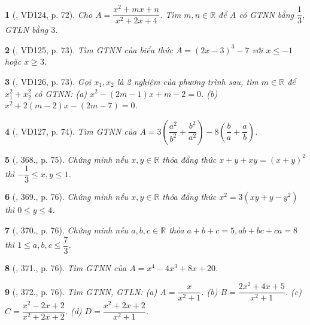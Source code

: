 \documentclass{article}
\newtheorem{baitoan}{}
\begin{document}
\begin{baitoan}[\cite{Binh_Toan_9_tap_2}, VD124, p. 72]
	Cho $A = \dfrac{x^2 + mx + n}{x^2 + 2x + 4}$. Tìm $m,n\in\mathbb{R}$ để $A$ có {\rm GTNN} bằng $\dfrac{1}{3}$, {\rm GTLN} bằng $3$.
\end{baitoan}

\begin{baitoan}[\cite{Binh_Toan_9_tap_2}, VD125, p. 73]
	Tìm {\rm GTNN} của biểu thức $A = (2x - 3)^3 - 7$ với $x\le-1$ hoặc $x\ge3$.
\end{baitoan}

\begin{baitoan}[\cite{Binh_Toan_9_tap_2}, VD126, p. 73]
	Gọi $x_1,x_2$ là 2 nghiệm của phương trình sau, tìm $m\in\mathbb{R}$ để $x_1^2 + x_2^2$ có {\rm GTNN}: (a) $x^2 - (2m - 1)x + m - 2 = 0$. (b) $x^2 + 2(m - 2)x - (2m - 7) = 0$.
\end{baitoan}

\begin{baitoan}[\cite{Binh_Toan_9_tap_2}, VD127, p. 74]
	Tìm {\rm GTNN} của $A = 3\left(\dfrac{a^2}{b^2} + \dfrac{b^2}{a^2}\right) - 8\left(\dfrac{b}{a} + \dfrac{a}{b}\right)$.
\end{baitoan}

\begin{baitoan}[\cite{Binh_Toan_9_tap_2}, 368., p. 75]
	Chứng minh nếu $x,y\in\mathbb{R}$ thỏa đẳng thức $x + y + xy = (x + y)^2$ thì $-\dfrac{1}{3}\le x,y\le1$.
\end{baitoan}

\begin{baitoan}[\cite{Binh_Toan_9_tap_2}, 369., p. 76]
	Chứng minh nếu $x,y\in\mathbb{R}$ thỏa đẳng thức $x^2 = 3(xy + y - y^2)$ thì $0\le y\le4$.
\end{baitoan}

\begin{baitoan}[\cite{Binh_Toan_9_tap_2}, 370., p. 76]
	Chứng minh nếu $a,b,c\in\mathbb{R}$ thỏa $a + b + c = 5,ab + bc + ca = 8$ thì $1\le a,b,c\le\dfrac{7}{3}$.
\end{baitoan}

\begin{baitoan}[\cite{Binh_Toan_9_tap_2}, 371., p. 76]
	Tìm {\rm GTNN} của $A = x^4 - 4x^3 + 8x + 20$.
\end{baitoan}

\begin{baitoan}[\cite{Binh_Toan_9_tap_2}, 372., p. 76]
	Tìm {\rm GTNN, GTLN}: (a) $A = \dfrac{x}{x^2 + 1}$. (b) $B = \dfrac{2x^2 + 4x + 5}{x^2 + 1}$. (c) $C = \dfrac{x^2 - 2x + 2}{x^2 + 2x + 2}$. (d) $D = \dfrac{x^2 + 2x + 2}{x^2 + 1}$.
\end{baitoan}
\end{document}
